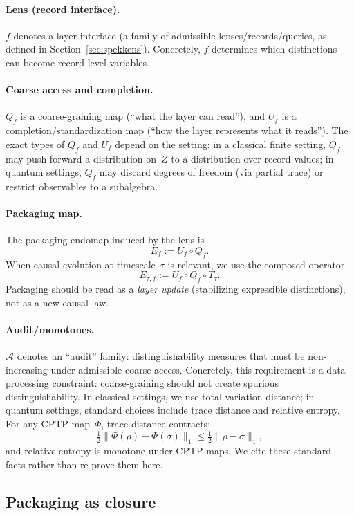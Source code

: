 \documentclass[11pt]{article}
\begin{document}
\paragraph{Lens (record interface).}
$f$ denotes a layer interface (a family of admissible lenses/records/queries, as defined in Section~\ref{sec:spekkens}). Concretely, $f$ determines which distinctions can become record-level variables.

\paragraph{Coarse access and completion.}
$Q_f$ is a coarse-graining map (``what the layer can read''), and $U_f$ is a completion/standardization map (``how the layer represents what it reads'').
The exact types of $Q_f$ and $U_f$ depend on the setting:
in a classical finite setting, $Q_f$ may push forward a distribution on~$Z$ to a distribution over record values;
in quantum settings, $Q_f$ may discard degrees of freedom (via partial trace) or restrict observables to a subalgebra.

\paragraph{Packaging map.}
The packaging endomap induced by the lens is
\[
E_f := U_f \circ Q_f.
\]
When causal evolution at timescale~$\tau$ is relevant, we use the composed operator
\[
E_{\tau,f} := U_f \circ Q_f \circ T_\tau .
\]
Packaging should be read as a \emph{layer update} (stabilizing expressible distinctions), not as a new causal law.

\paragraph{Audit/monotones.}
$\mathcal{A}$ denotes an ``audit'' family: distinguishability measures that must be non-increasing under admissible coarse access. Concretely, this requirement is a data-processing constraint:
coarse-graining should not create spurious distinguishability. In classical settings, we use total variation distance; in quantum settings, standard choices include trace distance and relative entropy. For any CPTP map~$\Phi$, trace distance contracts:
\[
\tfrac12\|\Phi(\rho)-\Phi(\sigma)\|_1 \le \tfrac12\|\rho-\sigma\|_1,
\]
and relative entropy is monotone under CPTP maps.\cite{NielsenChuang2010QCQI,Lindblad1975EntropyIneq} We cite these standard facts rather than re-prove them here.

\subsection{Packaging as closure}
\end{document}
